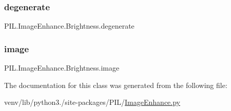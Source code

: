 \subsubsection{\texorpdfstring{degenerate}{degenerate}}
{\footnotesize\ttfamily P\+I\+L.\+Image\+Enhance.\+Brightness.\+degenerate}

\mbox{\label{classPIL_1_1ImageEnhance_1_1Brightness_a23f1bdddf742e3eba6c540b351372340}} 
\subsubsection{\texorpdfstring{image}{image}}
{\footnotesize\ttfamily P\+I\+L.\+Image\+Enhance.\+Brightness.\+image}



The documentation for this class was generated from the following file\+:\begin{DoxyCompactItemize}
\item 
venv/lib/python3./site-\/packages/\+P\+I\+L/\hyperlink{ImageEnhance_8py}{Image\+Enhance.\+py}\end{DoxyCompactItemize}
